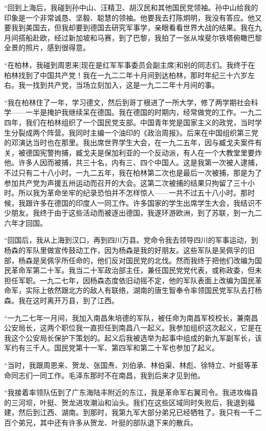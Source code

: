 \documentclass[10pt]{book}
\begin{document}
“回到上海后，我碰到孙中山、汪精卫、胡汉民和其他国民党领袖。孙中山给我的印象是一个非常诚恳、坚毅、聪慧的领袖。他要我去打陈炯明，我没有答应。他又要我到美国去，但我却要到德国去研究军事学，亲眼看看世界大战的结果。我在九月间搭船赴欧，经过新加坡和马赛，到了巴黎，我拍了一张从埃斐尔铁塔俯瞰巴黎全景的照片，感到很得意。

“在柏林，我碰到周恩来[现在是红军军事委员会副主席]和别的同志们。我终于在柏林找到了中国共产党！我在一九二二年十月间到达柏林，那时年纪三十六岁左右。我一找到共产党，当场立刻加入，这是一九二二年十月间的事。

“我在柏林住了一年，学习德文，然后到哥丁根进了一所大学，修了两学期社会科学——一半是掩护我继续呆在德国。我在德国的时期内，经常做党的工作。一九二四年，我们在柏林组织了一个国民党支部。中国青年党是国家主义的政党，当时学生分裂成两个阵营。我同时主编一个油印的《政治周报》。后来在中国组织第三党的邓演达当时也在那里。我出席世界学生大会，在一九二五年，因与臧戈夫案件有关，被德国宪警拘捕，臧戈夫是保加利亚的一个反动派，有人在一个大教堂里要炸他。许多人因而被捕，共三十名，内有三、四个中国人。这是我第一次被人逮捕，不过只有二十八小时。一九二五年，我在柏林第二次也是最后一次被捕，那是为了参加共产党为声援五卅运动而召开的大会。这第二次被捕的结果只拘留了三十小时。所以我为革命坐牢的纪录恐怕并不怎样惊人——一共不过五十八小时。那时候，我跟许多在德国的印度人一同工作。许多国家的学生出席学生大会，我结识不少朋友。我终于由于这些活动而被逐出德国，我遂环游欧洲，到了苏联，到一九二六年才回国。

“回国后，我从上海到汉口，再到四川万县。党命令我去领导四川的军事运动，到杨森的军队里做宣传鼓动工作，因为杨森是我的好朋友。这些军队是吴佩孚的旧部，杨森是吴佩孚所任命的，他们反对国民党的北伐。然而我终于把他们改编为国民革命军第二十军。我当二十军政治部主任，兼任国民党党代表，或称政委，但未担任军职。一九二七年，因杨森态度依旧动摇不定，他的军队表面上改编为国民革命军，实际上依然跟北方的敌人有联络，湖南的唐生智奉令率领国民党军队去打杨森。我在这时离开万县，到了江西。

“一九二七年一月间，我加入南昌朱培德的军队，被任命为南昌军校校长，兼南昌公安局长，这两个职位我一直担任到南昌八一起义。我参加组织这次起义，它是在我这个公安局长保护下策划的。起义后我被选举为起事中组成的新九军副军长，该军约有三千人。国民党第十一军、第四军和第二十军也参加了起义。

“当时，我跟周恩来、贺龙、张国焘、刘伯承、林伯渠、林彪、徐特立、叶挺等革命同志们一同工作。毛泽东那时不在南昌，我到后来才见到他。

“我接着率领队伍到了广东海陆丰附近的东江，我是革命军右翼司令。我进攻梅县的三河坝，叶挺、贺龙进攻潮汕和汕头。我们在这些区域同时失败后，我退到福建，然后到江西、湖南。到那时，我第九军大部分弟兄已经牺牲了。我只有一千二百个弟兄，其中还有许多从贺龙、叶挺的部队退下来的散兵。
\end{document}
